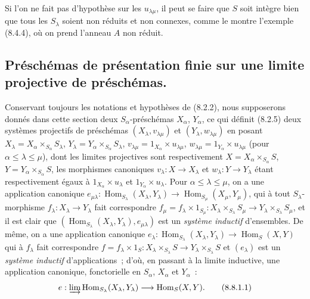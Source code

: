 \begin{remark}[8.7.4]
\label{IV.8.7.4-fr}
Si l'on ne fait pas d'hypothèse sur les $u_{\lambda\mu}$, il peut se faire que
$S$ soit intègre bien que tous les $S_\lambda$ soient non réduits et non
connexes, comme le montre l'exemple (8.4.4), où on prend l'anneau $A$ non
réduit.
\end{remark}

\subsection{Préschémas de présentation finie sur une limite projective de préschémas.}
\label{subsection:IV.8.8-fr}

\begin{env}[8.8.1]
\label{IV.8.8.1-fr}
Conservant toujours les notations et hypothèses de (8.2.2), nous supposerons
donnés dans cette section deux $S_\alpha$-préschémas $X_\alpha$, $Y_\alpha$,
ce qui définit (8.2.5) deux systèmes projectifs de préschémas
$(X_\lambda,v_{\lambda\mu})$ et $(Y_\lambda,w_{\lambda\mu})$ en posant
$X_\lambda=X_\alpha\times_{S_\alpha}S_\lambda$,
$Y_\lambda=Y_\alpha\times_{S_\alpha}S_\lambda$,
$v_{\lambda\mu}=1_{X_\alpha}\times u_{\lambda\mu}$,
$w_{\lambda\mu}=1_{Y_\alpha}\times u_{\lambda\mu}$ (pour
$\alpha\leq\lambda\leq\mu$), dont les limites projectives sont respectivement
$X=X_\alpha\times_{S_\alpha}S$, $Y=Y_\alpha\times_{S_\alpha}S$, les
morphismes canoniques $v_\lambda:X\to X_\lambda$ et
$w_\lambda:Y\to Y_\lambda$ étant respectivement égaux à
$1_{X_\alpha}\times u_\lambda$ et $1_{Y_\alpha}\times u_\lambda$. Pour
$\alpha\leq\lambda\leq\mu$, on a une application canonique
$e_{\mu\lambda}:\operatorname{Hom}_{S_\lambda}(X_\lambda,Y_\lambda)\to
\operatorname{Hom}_{S_\mu}(X_\mu,Y_\mu)$, qui à tout $S_\lambda$-morphisme
$f_\lambda:X_\lambda\to Y_\lambda$ fait correspondre
$f_\mu=f_\lambda\times1_{S_\mu}:X_\lambda\times_{S_\lambda}S_\mu\to
Y_\lambda\times_{S_\lambda}S_\mu$, et il est clair que
$(\operatorname{Hom}_{S_\lambda}(X_\lambda,Y_\lambda),e_{\mu\lambda})$ est un
\emph{système inductif} d'ensembles. De même, on a une application canonique
$e_\lambda:\operatorname{Hom}_{S_\lambda}(X_\lambda,Y_\lambda)\to
\operatorname{Hom}_S(X,Y)$ qui à $f_\lambda$ fait correspondre
$f=f_\lambda\times1_S:X_\lambda\times_{S_\lambda}S\to
Y_\lambda\times_{S_\lambda}S$ et $(e_\lambda)$ est un \emph{système inductif}
d'applications~; d'où, en passant à la limite inductive, une application
canonique, fonctorielle en $S_\alpha$, $X_\alpha$ et $Y_\alpha$~:
\begin{equation}
e:\varinjlim\operatorname{Hom}_{S_\lambda}(X_\lambda,Y_\lambda)
\longrightarrow\operatorname{Hom}_S(X,Y).
\tag{8.8.1.1}\label{IV.8.8.1.1-fr}
\end{equation}
\end{env}

